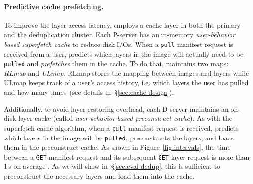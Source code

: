 \paragraph{Predictive cache prefetching.}
%
To improve the layer access latency, \sysname employs a cache layer in both the
primary and the deduplication cluster.
%
Each P-server has an in-memory \emph{user-behavior based superfetch cache} to
reduce disk I/Os.
%
When a \texttt{pull} manifest request is received from a user, \sysname
predicts which layers in the image will actually need to be \texttt{pulled} and
\emph{prefetches} them in the cache.
%
To do that, \sysname maintains two maps: \emph{RLmap} and \emph{ULmap}.
%
RLmap stores the mapping between images and layers while ULmap keeps track of a
user's access history, i.e. which layers the user has pulled and how many
times~(see details in~\S\ref{sec:cache-design}).

Additionally, to avoid layer restoring overhead,
each D-server maintains an on-disk layer cache (called \emph{user-behavior based preconstruct cache}).
%
As with the superfetch cache algorithm,
when a \texttt{pull} manifest request is received,
\sysname predicts which layers in the image will be \texttt{pulled},
preconstructs the layers, and loads them in the preconstruct cache.
%
As shown in Figure~\ref{fig:intervals}, the time between a \texttt{GET} manifest request and its
subsequent \texttt{GET} layer request is more than 1\,s on average . As we will show in~\S\ref{sec:eval-dedup}, this is
sufficient to preconstruct the necessary layers and load them into the cache.
